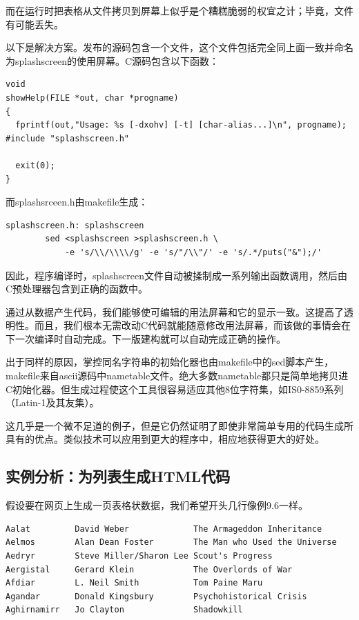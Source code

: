 \documentclass[12pt,oneside]{book}
\begin{document}
而在运行时把表格从文件拷贝到屏幕上似乎是个糟糕脆弱的权宜之计；毕竟，文件有可能丢失。

以下是解决方案。发布的源码包含一个文件，这个文件包括完全同上面一致并命名为splashscreen的使用屏幕。C源码包含以下函数：

\begin{Verbatim}
void 
showHelp(FILE *out, char *progname) 
{
  fprintf(out,"Usage: %s [-dxohv] [-t] [char-alias...]\n", progname);
#include "splashscreen.h"

  exit(0);
}
\end{Verbatim}

而splashsrceen.h由makefile生成：

\begin{Verbatim}
splashscreen.h: splashscreen
        sed <splashscreen >splashscreen.h \
            -e 's/\\/\\\\/g' -e 's/"/\\"/' -e 's/.*/puts("&");/' 
\end{Verbatim}

因此，程序编译时，splashscreen文件自动被揉制成一系列输出函数调用，然后由C预处理器包含到正确的函数中。

通过从数据产生代码，我们能够使可编辑的用法屏幕和它的显示一致。这提高了透明性。而且，我们根本无需改动C代码就能随意修改用法屏幕，而该做的事情会在下一次编译时自动完成。下一版建构就可以自动完成正确的操作。

出于同样的原因，掌控同名字符串的初始化器也由makefile中的sed脚本产生，makefile来自ascii源码中nametable文件。绝大多数nametable都只是简单地拷贝进C初始化器。但生成过程使这个工具很容易适应其他8位字符集，如IS0-8859系列（Latin-1及其友集）。

这几乎是一个微不足道的例子，但是它仍然证明了即使非常简单专用的代码生成所具有的优点。类似技术可以应用到更大的程序中，相应地获得更大的好处。


\subsection{实例分析：为列表生成HTML代码}
假设要在网页上生成一页表格状数据，我们希望开头几行像例9.6一样。

\begin{Verbatim}[label=例9.6 明星列表要求的输出格式]
Aalat         David Weber             The Armageddon Inheritance
Aelmos        Alan Dean Foster        The Man who Used the Universe 
Aedryr        Steve Miller/Sharon Lee Scout's Progress 
Aergistal     Gerard Klein            The Overlords of War 
Afdiar        L. Neil Smith           Tom Paine Maru 
Agandar       Donald Kingsbury        Psychohistorical Crisis 
Aghirnamirr   Jo Clayton              Shadowkill 
\end{Verbatim}
\end{document}
